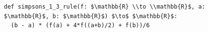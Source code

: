 \documentclass[border=10pt]{standalone}
\begin{document}
\begin{lstlisting}
def simpsons_1_3_rule(f: $\mathbb{R} \\to \\mathbb{R}$, a: $\mathbb{R}$, b: $\mathbb{R}$) $\to$ $\mathbb{R}$:
  (b - a) * (f(a) + 4*f((a+b)/2) + f(b))/6
\end{lstlisting}
\end{document}
